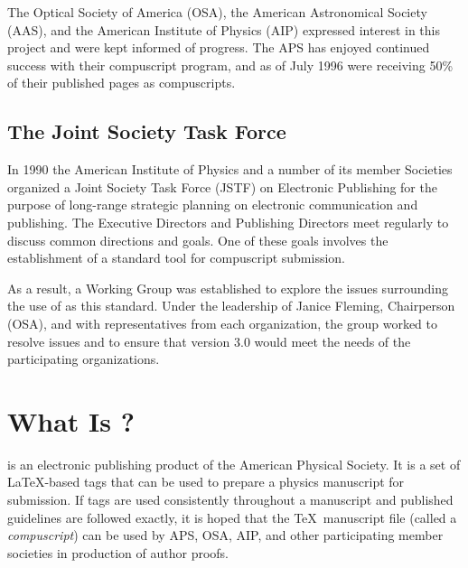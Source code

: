 {      The Optical Society of America (OSA), the American Astronomical
Society (AAS), and the American Institute of Physics (AIP) expressed
interest in this project and were kept informed of progress.  The APS has
enjoyed continued success with their compuscript program, and as of July
1996 were receiving 50\% of their published pages as compuscripts.

\subsection*{The Joint Society Task Force}

      In 1990 the American Institute of Physics and a number of its member
Societies organized a Joint Society Task Force (JSTF) on Electronic
Publishing for the purpose of long-range strategic planning on electronic
communication and publishing.  The Executive Directors and Publishing
Directors meet regularly to discuss common directions and goals.  One of
these goals involves the establishment of a standard tool for compuscript
submission.

      As a result, a \REVTeX{} Working Group was established to explore
the issues surrounding the use of \REVTeX{} as this standard.  Under the
leadership of Janice Fleming, Chairperson (OSA), and with representatives
from each organization, the group worked to resolve issues and to ensure
that \REVTeX{} version 3.0 would meet the needs of the participating
organizations.

\newpage

}



\section{What Is \REVTeX{}?}

\REVTeX{} is an electronic publishing product of the American Physical
Society.  It is a set of \LaTeX-based tags that can be used to prepare a
physics manuscript for submission. If \REVTeX{} tags are used consistently
throughout a manuscript and published guidelines are followed exactly, it
is hoped that the \TeX\ manuscript file (called a {\it compuscript}) can be
used by APS, OSA, AIP, and other participating member societies in
production of  author proofs.

